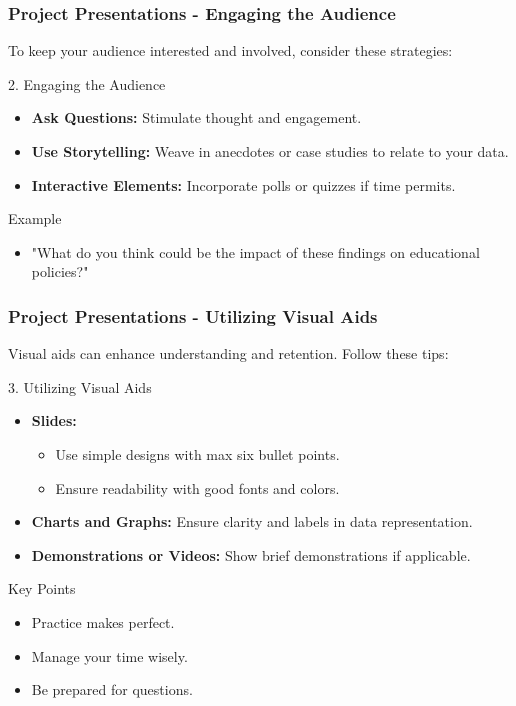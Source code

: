 \documentclass[aspectratio=169]{beamer}
\begin{document}
\begin{frame}[fragile]
    \frametitle{Project Presentations - Engaging the Audience}
    To keep your audience interested and involved, consider these strategies:

    \begin{block}{2. Engaging the Audience}
        \begin{itemize}
            \item \textbf{Ask Questions:} Stimulate thought and engagement. 
            \item \textbf{Use Storytelling:} Weave in anecdotes or case studies to relate to your data.
            \item \textbf{Interactive Elements:} Incorporate polls or quizzes if time permits.
        \end{itemize}
    \end{block}

    \begin{block}{Example}
        \begin{itemize}
            \item "What do you think could be the impact of these findings on educational policies?"
        \end{itemize}
    \end{block}
\end{frame}

\begin{frame}[fragile]
    \frametitle{Project Presentations - Utilizing Visual Aids}
    Visual aids can enhance understanding and retention. Follow these tips:

    \begin{block}{3. Utilizing Visual Aids}
        \begin{itemize}
            \item \textbf{Slides:}
                \begin{itemize}
                    \item Use simple designs with max six bullet points.
                    \item Ensure readability with good fonts and colors.
                \end{itemize}
            \item \textbf{Charts and Graphs:} Ensure clarity and labels in data representation.
            \item \textbf{Demonstrations or Videos:} Show brief demonstrations if applicable.
        \end{itemize}
    \end{block}

    \begin{block}{Key Points}
        \begin{itemize}
            \item Practice makes perfect.
            \item Manage your time wisely.
            \item Be prepared for questions.
        \end{itemize}
    \end{block}
\end{frame}
\end{document}
